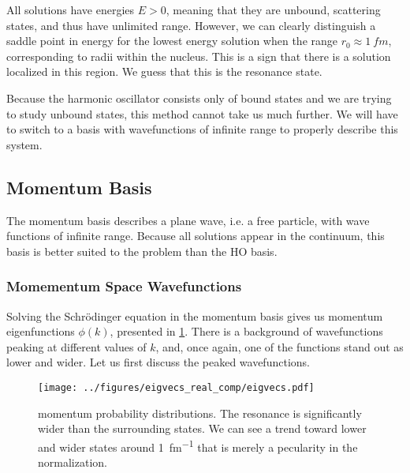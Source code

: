 \documentclass[../main/report.tex]{subfiles}
\begin{document}



All solutions have energies $E > 0$, meaning that they are unbound, scattering states, and thus have unlimited range. 
However, we can clearly distinguish a saddle point in energy for the lowest energy solution when the range $r_0 \approx \SI{1}{fm}$, corresponding to radii within the nucleus.
This is a sign that there is a solution localized in this region.
We guess that this is the resonance state.

Because the harmonic oscillator consists only of bound states and we are trying to study unbound states, this method cannot take us much further.
We will have to switch to a basis with wavefunctions of infinite range to properly describe this system.

\subsection{Momentum Basis}

The momentum basis describes a plane wave, i.e. a free particle, with wave functions of infinite range.
Because all  solutions appear in the continuum, this basis is better suited to the problem than the HO basis.

\subsubsection{Momementum Space Wavefunctions}

Solving the Schrödinger equation in the momentum basis gives us momentum eigenfunctions $\phi(k)$, presented in \cref{fig:real_momentum_wavefunctions}.
There is a background of wavefunctions peaking at different values of $k$, and, once again, one of the functions stand out as lower and wider. Let us first discuss the peaked wavefunctions.


\begin{figure}
  \centering
  	\texttt{[image: ../figures/eigvecs\_real\_comp/eigvecs.pdf]}

  \caption{ momentum probability distributions. The resonance is significantly wider than the surrounding states. We can see a trend toward lower and wider states around \SI{1}{fm^{-1}} that is merely a pecularity in the normalization.} 
  \label{fig:real_momentum_wavefunctions}
\end{figure}
\end{document}
